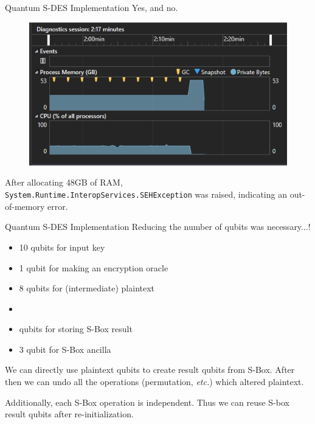 \documentclass{beamer}
\begin{document}
   	\begin{frame}{Quantum S-DES Implementation}
        Yes, and no.
   		\begin{figure}[h]
            \centering
            \includegraphics[height=0.5\textheight]{./Images/Qsharp-SDES-memory-error-2.png}
        \end{figure}
        After allocating 48GB of RAM, \texttt{System.Runtime.InteropServices.SEHException} was raised, indicating an out-of-memory error.
   	\end{frame}
       
   	\begin{frame}{Quantum S-DES Implementation}
        Reducing the number of qubits was necessary...!
        \begin{itemize}
            \item 10 qubits for input key
            \item 1 qubit for making an encryption oracle
            \item 8 qubits for (intermediate) plaintext
            \item {} 
            \item {} qubits for storing S-Box result
            \item 3 qubit for S-Box ancilla
        \end{itemize}
   		 We can directly use plaintext qubits to create result qubits from S-Box. After then we can undo all the operations (permutation, \textit{etc.}) which altered plaintext.
           
        Additionally, each S-Box operation is independent. Thus we can reuse S-box result qubits after re-initialization.
   	\end{frame} 
       
\end{document}
